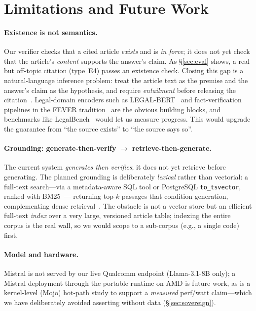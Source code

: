 \section{Limitations and Future Work}
\label{sec:limits}

\paragraph{Existence is not semantics.}
Our verifier checks that a cited article \emph{exists} and is \emph{in force};
it does not yet check that the article's \emph{content} supports the answer's
claim. As \S\ref{sec:eval} shows, a real but off-topic citation (type~E4)
passes an existence check. Closing this gap is a natural-language inference
problem: treat the article text as the premise and the answer's claim as the
hypothesis, and require \emph{entailment} before releasing the
citation~\cite{williams2018mnli}. Legal-domain encoders such as
LEGAL-BERT~\cite{chalkidis2020legalbert} and fact-verification pipelines in the
FEVER tradition~\cite{thorne2018fever} are the obvious building blocks, and
benchmarks like LegalBench~\cite{guha2023legalbench} would let us measure
progress. This would upgrade the guarantee from ``the source exists'' to ``the
source says so''.

\paragraph{Grounding: generate-then-verify $\rightarrow$ retrieve-then-generate.}
The current system \emph{generates then verifies}; it does not yet retrieve
before generating. The planned grounding is deliberately \emph{lexical} rather
than vectorial: a full-text search---via a metadata-aware SQL tool or
PostgreSQL \texttt{to\_tsvector}, ranked with BM25~\cite{robertson2009bm25}---
returning top-$k$ passages that condition generation, complementing dense
retrieval~\cite{karpukhin2020dpr, lewis2020rag}. The obstacle is not a vector
store but an efficient full-text \emph{index} over a very large, versioned
article table; indexing the entire corpus is the real wall, so we would scope
to a sub-corpus (e.g., a single code) first.

\paragraph{Model and hardware.}
Mistral is not served by our live Qualcomm endpoint (Llama-3.1-8B only); a
Mistral deployment through the portable runtime on AMD is future work, as is a
kernel-level (Mojo) hot-path study to support a \emph{measured} perf/watt
claim---which we have deliberately avoided asserting without data
(\S\ref{sec:sovereign}).

